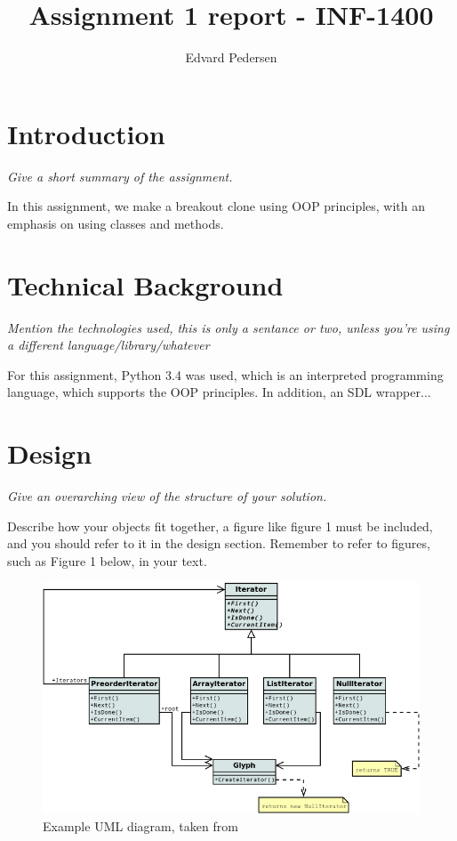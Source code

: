 \documentclass[11pt]{article}
\title{Assignment 1 report - INF-1400}
\author{Edvard Pedersen}
\begin{document}
\maketitle

\section{Introduction}

\emph{Give a short summary of the assignment.}

In this assignment, we make a breakout clone using OOP principles, with an emphasis on using classes and methods. 

\section{Technical Background}

\emph{Mention the technologies used, this is only a sentance or two, unless you're using a different language/library/whatever}

For this assignment, Python 3.4\cite{python} was used, which is an interpreted programming language, which supports the OOP principles. In addition, an SDL wrapper...

\section{Design}

\emph{Give an overarching view of the structure of your solution.}

Describe how your objects fit together, a figure like figure 1 must be included, and you should refer to it in the design section. Remember to refer to figures, such as Figure 1 below, in your text.

\begin{figure}[h]
	\centering
	\includegraphics[width=\textwidth]{UML_img.png}
	\caption{Example UML diagram, taken from \cite{umlsource}}
	\label{umlfig}
\end{figure}
\end{document}
